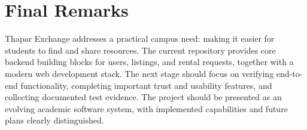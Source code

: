 \documentclass{tietreport}
\begin{document}
\section{Final Remarks}
Thapar Exchange addresses a practical campus need: making it easier for students to find and share resources. The current repository provides core backend building blocks for users, listings, and rental requests, together with a modern web development stack. The next stage should focus on verifying end-to-end functionality, completing important trust and usability features, and collecting documented test evidence. The project should be presented as an evolving academic software system, with implemented capabilities and future plans clearly distinguished.

\printbibliography[heading=bibintoc]
\end{document}
